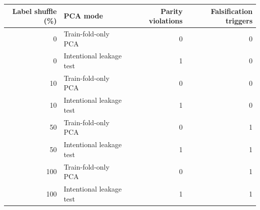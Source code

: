 \begin{tabular}{rlrr}
\hline
Label shuffle (\%) & PCA mode & Parity violations & Falsification triggers \\
\hline
0 & Train-fold-only PCA & 0 & 0 \\
0 & Intentional leakage test & 1 & 0 \\
10 & Train-fold-only PCA & 0 & 0 \\
10 & Intentional leakage test & 1 & 0 \\
50 & Train-fold-only PCA & 0 & 1 \\
50 & Intentional leakage test & 1 & 1 \\
100 & Train-fold-only PCA & 0 & 1 \\
100 & Intentional leakage test & 1 & 1 \\
\hline
\end{tabular}
